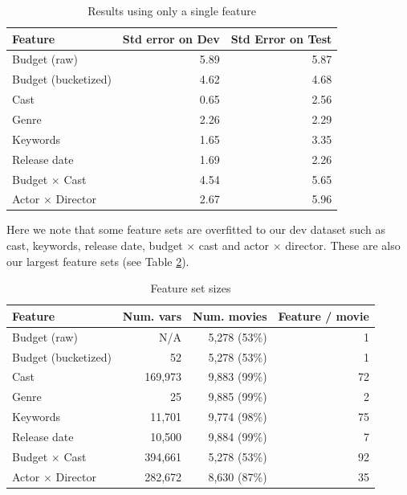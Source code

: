 \documentclass[journal]{IEEEtran}
\begin{document}
\begin{table}[ht]
\caption{Results using only a single feature} %
\centering %
\begin{tabular}{l r r} %
\hline\hline %
Feature & Std error on Dev & Std Error on Test \\ [0.5ex] %
\hline %
Budget (raw) & 5.89 & 5.87 \\ %
Budget (bucketized) & 4.62 & 4.68 \\
Cast & 0.65 & 2.56 \\
Genre & 2.26 & 2.29 \\
Keywords & 1.65 & 3.35 \\
Release date & 1.69 & 2.26 \\
Budget $\times$ Cast & 4.54 & 5.65 \\
Actor $\times$ Director & 2.67 & 5.96 \\
[1ex] %
\hline %
\end{tabular}
\label{table:nonlin} %
\end{table}

Here we note that some feature sets are overfitted to our dev dataset such as
cast, keywords, release date, budget $\times$ cast and actor $\times$ director.
These are also our largest feature sets (see Table \ref{table:featuresetsize}).

\begin{table}[ht]
\caption{Feature set sizes} %
\centering %
\begin{tabular}{l r r r} %
\hline\hline
Feature             & Num. vars & Num. movies & Feature / movie  \\ [0.5ex] %
\hline
Budget (raw)        & N/A & 5,278 (53\%) & 1 \\ %
Budget (bucketized) & 52 & 5,278 (53\%) & 1 \\
Cast                & 169,973 & 9,883 (99\%) & 72 \\
Genre               & 25 & 9,885 (99\%) & 2 \\
Keywords            & 11,701 & 9,774 (98\%) & 75 \\
Release date        & 10,500 & 9,884 (99\%) & 7 \\
Budget $\times$ Cast & 394,661 & 5,278 (53\%) & 92 \\
Actor $\times$ Director & 282,672 & 8,630 (87\%) & 35 \\
[1ex]
\hline %
\end{tabular}
\label{table:featuresetsize} %
\end{table}
\end{document}
